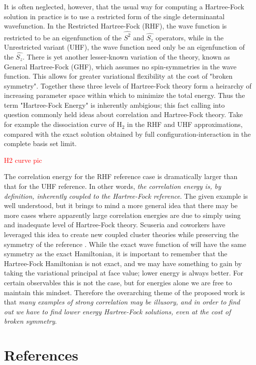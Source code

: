 \documentclass{revtex4}
\begin{document}
      It is often neglected, however, that the usual way for computing a Hartree-Fock solution in 
      practice
    is to use a restricted form of the single determinantal wavefunction. In the Restricted 
    Hartree-Fock (RHF), the wave function is restricted to be an eigenfunction of the $\hat{S^2}$ 
    and $\hat{S_z}$ 
    operators, while in the Unrestricted variant (UHF), the wave function need only be an 
    eigenfunction 
    of the $\hat{S_z}$. There is yet another lesser-known variation of the theory, known as General 
    Hartree-Fock (GHF), which assumes no spin-symmetries in the wave function. This allows for 
    greater
    variational flexibility at the cost of "broken symmetry". Together these three levels of 
    Hartree-Fock theory form a heirarchy of increasing parameter space within which to minimize the 
    total energy. Thus the term "Hartree-Fock Energy" is inherently ambigious; this fact calling 
    into question commonly held ideas about correlation and Hartree-Fock theory. Take for example 
    the dissociation curve of H$_2$ in the RHF and UHF approximations, compared with the exact 
    solution obtained by full configuration-interaction in the complete basis set limit. 
    
    \textcolor{red}{H2 curve pic}
    
    The correlation energy for the RHF reference case is dramatically larger than that for the UHF 
    reference. In other words, \emph{the correlation energy is, by definition, inherently coupled 
    to the 
    Hartree-Fock reference}. The given example is well understood, but it brings to mind a more 
    general idea that there may be more cases where apparently large correlation energies are due 
    to simply 
    using and inadequate level of Hartree-Fock theory. Scuseria and coworkers have leveraged this 
    idea to create new coupled cluster theories while preserving the symmetry of the reference 
    \cite{Gomez2016}. While the exact wave function of will have the same symmetry as the exact 
    Hamiltonian, it is important to remember that the Hartree-Fock Hamiltonian is not exact, and we 
    may have something to gain by taking the variational principal at face value; lower energy is 
    always better. For certain observables this is not the case, but for energies alone we are free 
    to maintain this mindset. Therefore the overarching theme of the proposed work is that 
    \emph{many 
    examples of strong correlation may be illusory, and in order to find out we have to find lower 
    energy Hartree-Fock solutions, even at the cost of broken symmetry}.    

\section{References}

\end{document}
